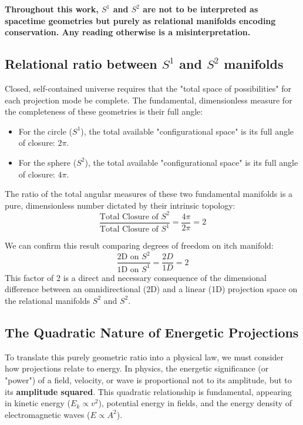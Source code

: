 \documentclass[12pt, a4paper]{article}
\begin{document}
\begin{tcolorbox}[colback=gray!5, colframe=black!80!black, title=IMPORTANT:]
\textbf{Throughout this work, $S^1$ and $S^2$ are not to be interpreted as spacetime geometries but purely as relational manifolds encoding conservation. Any reading otherwise is a misinterpretation.}
\end{tcolorbox}

\subsection{Relational ratio between $S^1$ and $S^2$ manifolds}

Closed, self-contained universe requires that the "total space of possibilities" for each projection mode be complete. The fundamental, dimensionless measure for the completeness of these geometries is their full angle:

\begin{itemize}
    \item For the circle ($S^1$), the total available "configurational space" is its full angle of closure: $2\pi$.
    \item For the sphere ($S^2$), the total available "configurational space" is its full angle of closure: $4\pi$.
\end{itemize}

The ratio of the total angular measures of these two fundamental manifolds is a pure, dimensionless number dictated by their intrinsic topology:
\[
\frac{\text{Total Closure of $S^2$}}{\text{Total Closure of $S^1$}} = \frac{4\pi}{2\pi} = 2
\]

We can confirm this result comparing degrees of freedom on itch manifold:
\[
\frac{\text{2D on $S^2$}}{\text{1D on $S^1$}} = \frac{2D}{1D} = 2
\]
This factor of 2 is a direct and necessary consequence of the dimensional difference between an omnidirectional (2D) and a linear (1D) projection space on the relational manifolds $S^2$ and $S^2$.

\subsection{The Quadratic Nature of Energetic Projections}

To translate this purely geometric ratio into a physical law, we must consider how projections relate to energy. In physics, the energetic significance (or "power") of a field, velocity, or wave is proportional not to its amplitude, but to its \textbf{amplitude squared}. This quadratic relationship is fundamental, appearing in kinetic energy ($E_k \propto v^2$), potential energy in fields, and the energy density of electromagnetic waves ($E \propto A^2$).
\end{document}
